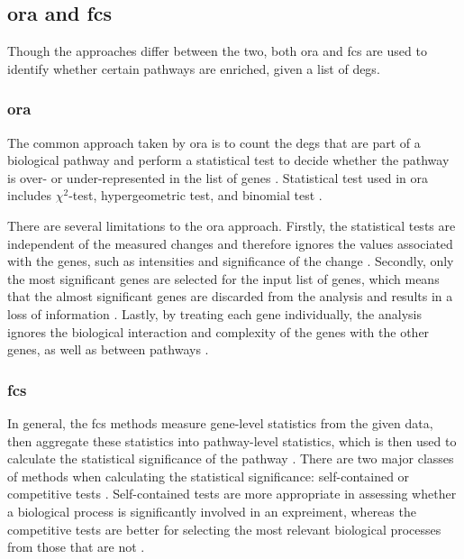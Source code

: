 \subsection{\Gls{ora} and \gls{fcs}}
\label{sub:ora_and_fcs}

Though the approaches differ between the two, both \acrfull{ora} and \acrfull{fcs} are used to identify whether certain pathways are enriched, given a list of \glspl{deg}.

\subsubsection{\Gls{ora}}
\label{ssub:ora}

The common approach taken by \gls{ora} is to count the \glspl{deg} that are part of a biological pathway and perform a statistical test to decide whether the pathway is over- or under-represented in the list of genes \citep{Khatri2012}.
Statistical test used in \gls{ora} includes $\chi^2$-test, hypergeometric test, and binomial test \citep{Khatri2012}.

There are several limitations to the \gls{ora} approach.
Firstly, the statistical tests are independent of the measured changes and therefore ignores the values associated with the genes, such as intensities and significance of the change \citep{Khatri2012}.
Secondly, only the most significant genes are selected for the input list of genes, which means that the almost significant genes are discarded from the analysis and results in a loss of information \citep{Khatri2012}.
Lastly, by treating each gene individually, the analysis ignores the biological interaction and complexity of the genes with the other genes, as well as between pathways \citep{Khatri2012}.

\subsubsection{\gls{fcs}}
\label{ssub:fcs}

In general, the \gls{fcs} methods measure gene-level statistics from the given data, then aggregate these statistics into pathway-level statistics, which is then used to calculate the statistical significance of the pathway \citep{Khatri2012}.
There are two major classes of methods when calculating the statistical significance: self-contained or competitive tests \citep{Goeman2007}.
Self-contained tests are more appropriate in assessing whether a biological process is significantly involved in an expreiment, whereas the competitive tests are better for selecting the most relevant biological processes from those that are not \citep{Wu2012}.

